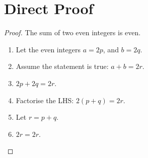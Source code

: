 \section{Direct Proof}
\begin{proof}
    The sum of two even integers is even.
    \begin{enumerate}
        \item Let the even integers \(a = 2p\), and \(b = 2q\).
        \item Assume the statement is true: \(a + b = 2r\).
        \item \(2p + 2q = 2r\).
        \item Factorise the LHS: \(2(p + q) = 2r\).
        \item Let \(r = p + q\).
        \item \(2r = 2r\).
    \end{enumerate}
\end{proof}
